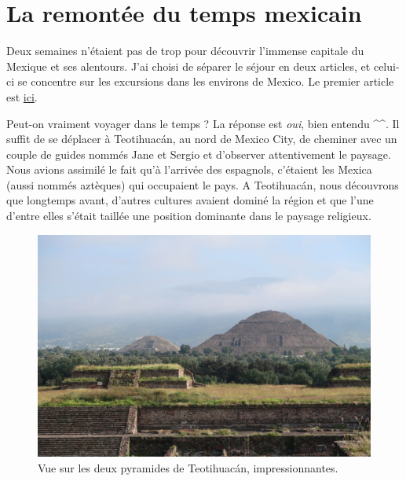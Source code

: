 \hypertarget{la-remontuxe9e-du-temps-mexicain}{%
\section{La remontée du temps
mexicain}\label{la-remontuxe9e-du-temps-mexicain}}

Deux semaines n'étaient pas de trop pour découvrir l'immense capitale du
Mexique et ses alentours. J'ai choisi de séparer le séjour en deux
articles, et celui-ci se concentre sur les excursions dans les environs
de Mexico. Le premier article est
\href{/immersion-culturelle-mexico.html}{ici}.

Peut-on vraiment voyager dans le temps ? La réponse est \emph{oui}, bien
entendu \^{}\^{}. Il suffit de se déplacer à Teotihuacán, au nord de
Mexico City, de cheminer avec un couple de guides nommés Jane et Sergio
et d'observer attentivement le paysage. Nous avions assimilé le fait
qu'à l'arrivée des espagnols, c'étaient les Mexica (aussi nommés
aztèques) qui occupaient le pays. A Teotihuacán, nous découvrons que
longtemps avant, d'autres cultures avaient dominé la région et que l'une
d'entre elles s'était taillée une position dominante dans le paysage
religieux.

\begin{figure}
\centering
\includegraphics{images/20180930_teotihuacan.JPG}
\caption{Vue sur les deux pyramides de Teotihuacán, impressionnantes.}
\end{figure}

